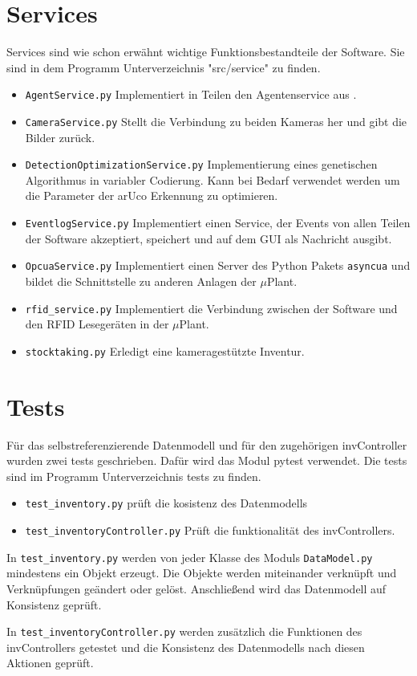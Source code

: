 \section{Services}
Services sind wie schon erwähnt wichtige Funktionsbestandteile der Software. Sie sind in dem Programm Unterverzeichnis "src/service" zu finden.
\begin{itemize}
    \item \verb|AgentService.py| Implementiert in Teilen den Agentenservice aus \cite{LarsKistner2017}.
    \item \verb|CameraService.py| Stellt die Verbindung zu beiden Kameras her und gibt die Bilder zurück.
    \item \verb|DetectionOptimizationService.py| Implementierung eines genetischen Algorithmus in variabler Codierung. Kann bei Bedarf verwendet werden um die 
    Parameter der arUco Erkennung zu optimieren. 
    \item \verb|EventlogService.py| Implementiert einen Service, der Events von allen Teilen der Software akzeptiert, speichert und auf dem GUI als Nachricht ausgibt. 
    \item \verb|OpcuaService.py| Implementiert einen Server des Python Pakets \verb|asyncua| \cite{asyncua} und bildet die Schnittstelle zu anderen Anlagen der $\mu$Plant. 
    \item \verb|rfid_service.py| Implementiert die Verbindung zwischen der Software und den RFID Lesegeräten in der $\mu$Plant. 
    \item \verb|stocktaking.py| Erledigt eine kameragestützte Inventur. 
\end{itemize}

\section{Tests}
Für das selbstreferenzierende Datenmodell und für den zugehörigen \glqq invController \grqq  wurden zwei tests geschrieben. 
Dafür wird das Modul \glqq pytest \grqq verwendet. Die tests sind im Programm Unterverzeichnis \glqq tests \grqq zu finden. 
\begin{itemize}
    \item \verb|test_inventory.py| prüft die kosistenz des Datenmodells
    \item \verb|test_inventoryController.py| Prüft die funktionalität des invControllers.
\end{itemize} 
In \verb|test_inventory.py| werden von jeder Klasse des Moduls \verb|DataModel.py| mindestens ein Objekt erzeugt. 
Die Objekte werden miteinander verknüpft und Verknüpfungen geändert oder gelöst. Anschließend wird das Datenmodell auf Konsistenz geprüft. 

In \verb|test_inventoryController.py| werden zusätzlich die Funktionen des invControllers getestet und die Konsistenz des
Datenmodells nach diesen Aktionen geprüft. 
